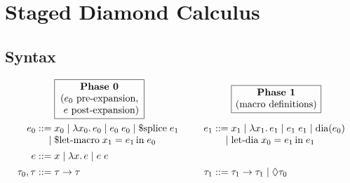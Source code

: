 \documentclass{article}
\begin{document}
\section{Staged Diamond Calculus}

\subsection{Syntax}

\vspace{2ex}
\noindent
\[\arraycolsep=1.4pt
\begin{array}{rlcrl}
                 & \boxed{\text{\parbox{8.5em}{\centering
                     \textbf{Phase 0}\\
                     ($e_0$ pre-expansion,\\
                     \hphantom{(}$e$ post-expansion)
                   }}}
                 & \hspace{2em} &
                 & \boxed{\text{\parbox{8.5em}{\centering
                     \textbf{Phase 1}\\
                     (macro definitions)
                   }}}
                \vspace{1ex}
                \\
         e_0 ::= & x_0
              \mid \lambda x_0.\,e_0
              \mid e_0\;e_0
              \mid \text{\$splice}\;e_1
                 & \hspace{2em} &
         e_1 ::= & x_1
              \mid \lambda x_1.\,e_1
              \mid e_1\;e_1
              \mid \text{dia}(e_0)
                \\
            \mid & \text{\$let-macro}\;x_1 = e_1\,\text{in}\;e_0
                 & \hspace{2em}
                 & 
            \mid & \text{let-dia}\;x_0 = e_1\,\text{in}\;e_1
                \vspace{1ex}
                \\
           e ::= & x
              \mid \lambda x.\,e
              \mid e\;e
                \vspace{1ex}
                \\
\tau_0, \tau ::= & \tau \to \tau
                 & \hspace{2em} &
      \tau_1 ::= & \tau_1 \to \tau_1
              \mid \Diamond \tau_0

\end{array}\]
\end{document}
